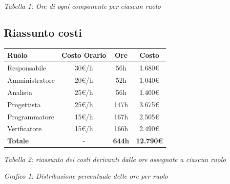 \documentclass[a4paper,11pt]{article}
\begin{document}
\begin{center}
\textit{Tabella 1: Ore di ogni componente per ciascun ruolo}
\end{center}

\newpage

\subsection{Riassunto costi}

{\footnotesize
\begin{center}
\label{tab:costi-ruoli}
\begin{tabular}{|l|c|c|c|}
\hline
\textbf{Ruolo} & \textbf{Costo Orario} & \textbf{Ore} & \textbf{Costo} \\
\hline
Responsabile & 30€/h & 56h & 1.680€ \\
Amministratore & 20€/h & 52h & 1.040€ \\
Analista & 25€/h & 56h & 1.400€ \\
Progettista & 25€/h & 147h & 3.675€ \\
Programmatore & 15€/h & 167h & 2.505€ \\
Verificatore & 15€/h & 166h & 2.490€ \\
\hline
\textbf{Totale} & - & \textbf{644h} & \textbf{12.790€} \\
\hline
\end{tabular}
\end{center}
}

\begin{center}
\textit{Tabella 2: riassunto dei costi derivanti dalle ore assegnate a ciascun ruolo}
\end{center}

\vspace{1cm}

\begin{center}
\end{center}

\begin{center}
\textit{Grafico 1: Distribuzione percentuale delle ore per ruolo}
\end{center}
\end{document}
